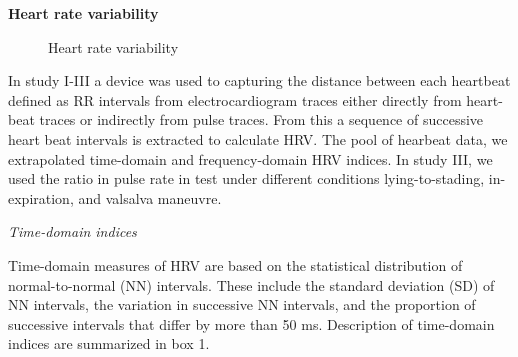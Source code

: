 \documentclass[
  a4paper,
  headsepline=true,
  open=any]{scrbook}
\begin{document}
\textbf{Heart rate variability}

\begin{figure}

\begin{minipage}[t]{\linewidth}

{\centering 


\caption{Heart rate variability}

}

\end{minipage}%

\end{figure}

In study I-III a device was used to capturing the distance between each
heartbeat defined as RR intervals from electrocardiogram traces either
directly from heart-beat traces or indirectly from pulse traces. From
this a sequence of successive heart beat intervals is extracted to
calculate HRV. The pool of hearbeat data, we extrapolated time-domain
and frequency-domain HRV indices. In study III, we used the ratio in
pulse rate in test under different conditions lying-to-stading, in-
expiration, and valsalva maneuvre.

\emph{Time-domain indices}

Time-domain measures of HRV are based on the statistical distribution of
normal-to-normal (NN) intervals. These include the standard deviation
(SD) of NN intervals, the variation in successive NN intervals, and the
proportion of successive intervals that differ by more than 50 ms.
Description of time-domain indices are summarized in box 1.
\end{document}
